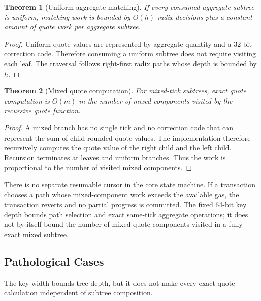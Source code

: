 \documentclass[11pt]{article}
\newtheorem{theorem}{Theorem}
\begin{document}
\begin{theorem}[Uniform aggregate matching]
If every consumed aggregate subtree is uniform, matching work is bounded
by \(O(h)\) radix decisions plus a constant amount of quote work per
aggregate subtree.
\end{theorem}

\begin{proof}
Uniform quote values are represented by aggregate quantity and a 32-bit
correction code.  Therefore consuming a uniform subtree does not require
visiting each leaf.  The traversal follows right-first radix paths whose
depth is bounded by \(h\).
\end{proof}

\begin{theorem}[Mixed quote computation]
For mixed-tick subtrees, exact quote computation is \(O(m)\) in the
number of mixed components visited by the recursive quote function.
\end{theorem}

\begin{proof}
A mixed branch has no single tick and no correction code that can
represent the sum of child rounded quote values.  The implementation
therefore recursively computes the quote value of the right child and
the left child.  Recursion terminates at leaves and uniform branches.
Thus the work is proportional to the number of visited mixed components.
\end{proof}

There is no separate resumable cursor in the core state machine.  If a
transaction chooses a path whose mixed-component work exceeds the
available gas, the transaction reverts and no partial progress is
committed.  The fixed 64-bit key depth bounds path selection and exact
same-tick aggregate operations; it does not by itself bound the number
of mixed quote components visited in a fully exact mixed subtree.

\subsection{Pathological Cases}

The key width bounds tree depth, but it does not make every exact quote
calculation independent of subtree composition.
\end{document}
